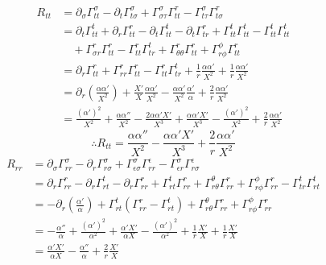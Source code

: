\documentclass[12pt]{report}
\begin{document}
	\begin{align*}
		R_{tt} &= \partial_\sigma\Gamma^\sigma_{tt} - \partial_t\Gamma^\sigma_{t\sigma} + \Gamma^\sigma_{\sigma\tau}\Gamma^\tau_{tt} - \Gamma^\sigma_{t\tau}\Gamma^\tau_{t\sigma} \\
		&= \partial_t\Gamma^t_{tt} + \partial_r\Gamma^r_{tt} - \partial_t\Gamma^t_{tt} - \partial_t\Gamma^r_{tr} + \Gamma^t_{tt}\Gamma^t_{tt} - \Gamma^t_{tt}\Gamma^t_{tt} \\
		&\quad + \Gamma^r_{\sigma r}\Gamma^r_{tt} - \Gamma^r_{tt}\Gamma^t_{tr} + \Gamma^r_{\theta\theta}\Gamma^r_{tt} + \Gamma^\phi_{r\phi}\Gamma^r_{tt} \\
		&= \partial_r\Gamma^r_{tt} + \Gamma^r_{rr}\Gamma^r_{tt} - \Gamma^r_{tt}\Gamma^t_{tr} + \frac{1}{r}\frac{\alpha\alpha'}{X^2} + \frac{1}{r}\frac{\alpha\alpha'}{X^2} \\
		&= \partial_r\left(\frac{\alpha\alpha'}{X^2}\right) + \frac{X'}{X}\frac{\alpha\alpha'}{X^2} - \frac{\alpha\alpha'}{X^2}\frac{\alpha'}{\alpha} + \frac{2}{r}\frac{\alpha\alpha'}{X^2} \\
		&= \frac{(\alpha')^2}{X^2} + \frac{\alpha\alpha''}{X^2} - \frac{2\alpha\alpha'X'}{X^3} + \frac{\alpha\alpha'X'}{X^3} - \frac{(\alpha')^2}{X^2} + \frac{2}{r}\frac{\alpha\alpha'}{X^2}
	\end{align*}
	\begin{equation}
		\therefore \boxed{R_{tt} = \frac{\alpha\alpha''}{X^2} - \frac{\alpha\alpha'X'}{X^3} + \frac{2}{r}\frac{\alpha\alpha'}{X^2}}
	\end{equation}
	\begin{align*}
		R_{rr} &= \partial_\sigma\Gamma^{\sigma}_{rr} - \partial_r\Gamma^{\sigma}_{r\sigma} + \Gamma^{\sigma}_{\epsilon\sigma}\Gamma^{\epsilon}_{rr} - \Gamma^{\sigma}_{\epsilon r}\Gamma^{\epsilon}_{r\sigma}\\
		&= \partial_r\Gamma^r_{rr} - \partial_r\Gamma^t_{rt} - \partial_r\Gamma^r_{rr} + \Gamma^t_{rt}\Gamma^r_{rr} + \Gamma^{\theta}_{r\theta}\Gamma^r_{rr} + \Gamma^{\phi}_{r\phi}\Gamma^r_{rr} - \Gamma^t_{tr}\Gamma^t_{rt} \\
		& = -\partial_r\left(\frac{\alpha'}{\alpha}\right) + \Gamma^t_{rt}\left(\Gamma^r_{rr} - \Gamma^t_{rt}\right) + \Gamma^{\theta}_{r\theta}\Gamma^r_{rr} + \Gamma^{\phi}_{r\phi}\Gamma^r_{rr} \\
		& = -\frac{\alpha''}{\alpha} + \frac{(\alpha')^2}{\alpha^2} + \frac{\alpha'X'}{\alpha X} - \frac{(\alpha')^2}{\alpha^2} + \frac{1}{r}\frac{X'}{X} + \frac{1}{r}\frac{X'}{X} \\
		&= \frac{\alpha'X'}{\alpha X} - \frac{\alpha''}{\alpha} + \frac{2}{r}\frac{X'}{X}  
	\end{align*}
\end{document}

